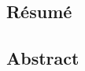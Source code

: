 \documentclass[final, cover]{mpg-preth}
\begin{document}
\thispagestyle{empty}

\subsection*{Résumé}

\lipsum[3]


\subsection*{Abstract}

\lipsum[2]
\end{document}
